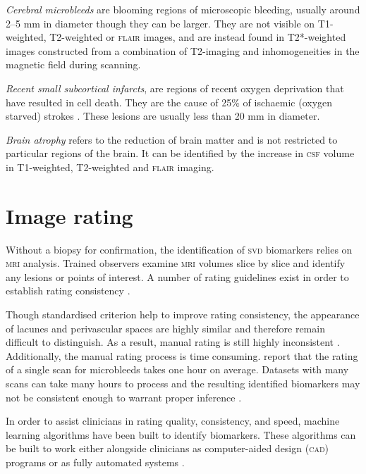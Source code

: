 \textit{Cerebral microbleeds} are blooming regions of microscopic bleeding, usually around 2--5 mm in diameter though they can be larger. They are not visible on T1-weighted, T2-weighted or \textsc{flair} images, and are instead found in T2*-weighted images constructed from a combination of T2-imaging and inhomogeneities in the magnetic field during scanning. 

\textit{Recent small subcortical infarcts}, are regions of recent oxygen deprivation that have resulted in cell death. They are the cause of 25\% of ischaemic (oxygen starved) strokes \citep{WardlawJ.M.2013Nsfr}. These lesions are usually less than 20 mm in diameter. 

\textit{Brain atrophy} refers to the reduction of brain matter and is not restricted to particular regions of the brain. It can be identified by the increase in \textsc{csf} volume in T1-weighted, T2-weighted and \textsc{flair} imaging.

\section{Image rating}\label{svd-rating}

Without a biopsy for confirmation, the identification of \textsc{svd} biomarkers relies on \textsc{mri} analysis. Trained observers examine \textsc{mri} volumes slice by slice and identify any lesions or points of interest. A number of rating guidelines exist in order to establish rating consistency \citep{AdamsH.H.Hieab2013RMfD, PotterGillian2015CPSV, WardlawJ.M.2013Nsfr}.

Though standardised criterion help to improve rating consistency, the appearance of lacunes and perivascular spaces are highly similar and therefore remain difficult to distinguish. As a result, manual rating is still highly inconsistent \citep{PotterGillian2015CPSV}. Additionally, the manual rating process is time consuming. \cite{Heuvel2016} report that the rating of a single scan for microbleeds takes one hour on average. Datasets with many scans can take many hours to process and the resulting identified biomarkers may not be consistent enough to warrant proper inference \citep{BenjaminJ.Philip2018LIbN, WardlawJ.M.2013Nsfr}.

In order to assist clinicians in rating quality, consistency, and speed, machine learning algorithms have been built to identify biomarkers. These algorithms can be built to work either alongside clinicians as computer-aided design (\textsc{cad}) programs \citep{Heuvel2016, Uchiyama20071554, Yokoyama2007} or as fully automated systems \citep{DouQ.2016ADoC, GhafoorianM.2017Dml3}.

